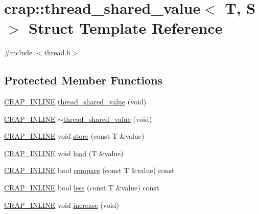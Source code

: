 \hypertarget{structcrap_1_1thread__shared__value}{\section{crap\+:\+:thread\+\_\+shared\+\_\+value$<$ T, S $>$ Struct Template Reference}
\label{structcrap_1_1thread__shared__value}
}


{\ttfamily \#include $<$thread.\+h$>$}

\subsection*{Protected Member Functions}
\begin{DoxyCompactItemize}
\item 
\hyperlink{config__x86_8h_a5a40526b8d842e7ff731509998bb0f1c}{C\+R\+A\+P\+\_\+\+I\+N\+L\+I\+N\+E} \hyperlink{structcrap_1_1thread__shared__value_a6b2471ad4d473c88c084fff8df54a9c9}{thread\+\_\+shared\+\_\+value} (void)
\item 
\hyperlink{config__x86_8h_a5a40526b8d842e7ff731509998bb0f1c}{C\+R\+A\+P\+\_\+\+I\+N\+L\+I\+N\+E} \hyperlink{structcrap_1_1thread__shared__value_a653927a46a7caea4945a33dc7f44fa84}{$\sim$thread\+\_\+shared\+\_\+value} (void)
\item 
\hyperlink{config__x86_8h_a5a40526b8d842e7ff731509998bb0f1c}{C\+R\+A\+P\+\_\+\+I\+N\+L\+I\+N\+E} void \hyperlink{structcrap_1_1thread__shared__value_a4c0a3a14b1cf3dca675f3776f556fe86}{store} (const T \&value)
\item 
\hyperlink{config__x86_8h_a5a40526b8d842e7ff731509998bb0f1c}{C\+R\+A\+P\+\_\+\+I\+N\+L\+I\+N\+E} void \hyperlink{structcrap_1_1thread__shared__value_a218d2dfd30d50fedf152af5db5cc38f4}{load} (T \&value)
\item 
\hyperlink{config__x86_8h_a5a40526b8d842e7ff731509998bb0f1c}{C\+R\+A\+P\+\_\+\+I\+N\+L\+I\+N\+E} bool \hyperlink{structcrap_1_1thread__shared__value_a38c3ac00309d0531759a2ab7721f37ee}{compare} (const T \&value) const 
\item 
\hyperlink{config__x86_8h_a5a40526b8d842e7ff731509998bb0f1c}{C\+R\+A\+P\+\_\+\+I\+N\+L\+I\+N\+E} bool \hyperlink{structcrap_1_1thread__shared__value_a86eee8ff8c4088b22d42d437489166bb}{less} (const T \&value) const 
\item 
\hyperlink{config__x86_8h_a5a40526b8d842e7ff731509998bb0f1c}{C\+R\+A\+P\+\_\+\+I\+N\+L\+I\+N\+E} void \hyperlink{structcrap_1_1thread__shared__value_a03bf18399f5e1021bab2fd5fde1d7161}{increase} (void)

\end{DoxyCompactItemize}
